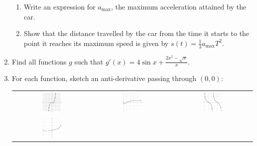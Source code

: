 \begin{enumerate}
\begin{displaymath}
        \end{displaymath}
    \begin{enumerate}
      \item Write an expression for $ a_\text{max} $, the maximum acceleration attained by the car.
      \item Show that the distance travelled by the car from the time it starts to the point it reaches its maximum
            speed is given by $ s(t) = \frac{1}{3} a_\text{max} T^2 $.
    \end{enumerate}
  \item Find all functions $ g $ such that $ g'(x) = 4 \sin x + \frac{2x^5 - \sqrt{x}}{x} $.
  \item For each function, sketch an anti-derivative passing through $ (0, 0) $:
        \begin{center}
          \begin{tabular}{ccc}
            \includegraphics[width=0.28\textwidth]{anti1}&
            \includegraphics[width=0.28\textwidth]{anti2}&
            \includegraphics[width=0.28\textwidth]{anti3}\\
            \includegraphics[width=0.28\textwidth]{anti4}&

\end{tabular}
\end{center}
\end{enumerate}
